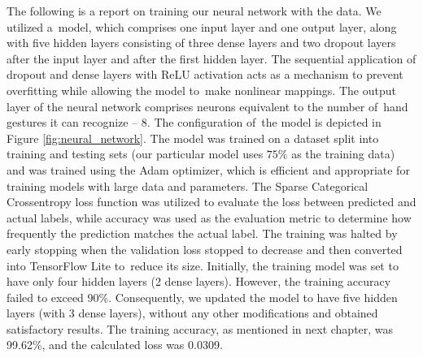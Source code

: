 The following is a report on training our neural network with the data. We utilized a~model, which comprises one input layer and one output layer, along with five hidden layers consisting of three dense layers and two dropout layers after the input layer and after the first hidden layer. The sequential application of dropout and dense layers with ReLU activation acts as a mechanism to prevent overfitting while allowing the model to~make nonlinear mappings. The output layer of the neural network comprises neurons equivalent to the number of~hand gestures it can recognize – 8. The configuration of~the model is depicted in Figure \ref{fig:neural_network}. The model was trained on a dataset split into training and testing sets (our particular model uses $75\%$ as the training data) and was trained using the Adam optimizer, which is efficient and appropriate for training models with large data and parameters. The Sparse Categorical Crossentropy loss function was utilized to evaluate the loss between predicted and actual labels, while accuracy was used as the evaluation metric to determine how frequently the prediction matches the actual label. The training was halted by early stopping when the validation loss stopped to decrease and then converted into TensorFlow Lite to~reduce its size. Initially, the training model was set to have only four hidden layers (2 dense layers). However, the training accuracy failed to exceed 90\%. Consequently, we updated the model to have five hidden layers (with 3 dense layers), without any other modifications and obtained satisfactory results. The training accuracy, as mentioned in next chapter, was 99.62\%, and the calculated loss was 0.0309.





